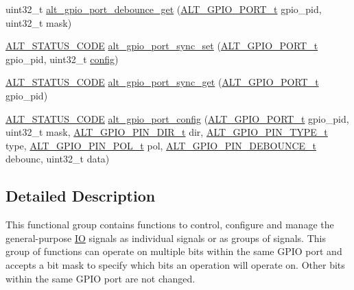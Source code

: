 \begin{DoxyCompactItemize}
\item 
uint32\+\_\+t \mbox{\hyperlink{group__ALT__GPIO__API__CONFIG_ga371b473428c4fe83d72d71d3fac76d6a}{alt\+\_\+gpio\+\_\+port\+\_\+debounce\+\_\+get}} (\mbox{\hyperlink{group__ALT__GPIO__API__CONFIG_gaaf1cf0e2a720d20cd883810f2b59097e}{A\+L\+T\+\_\+\+G\+P\+I\+O\+\_\+\+P\+O\+R\+T\+\_\+t}} gpio\+\_\+pid, uint32\+\_\+t mask)
\item 
\mbox{\hyperlink{hwlib_8h_abdb0d369f069723ca55d6c94bcaaaa12}{A\+L\+T\+\_\+\+S\+T\+A\+T\+U\+S\+\_\+\+C\+O\+DE}} \mbox{\hyperlink{group__ALT__GPIO__API__CONFIG_ga65d15bcd67c5c4388fbeff6e015a5296}{alt\+\_\+gpio\+\_\+port\+\_\+sync\+\_\+set}} (\mbox{\hyperlink{group__ALT__GPIO__API__CONFIG_gaaf1cf0e2a720d20cd883810f2b59097e}{A\+L\+T\+\_\+\+G\+P\+I\+O\+\_\+\+P\+O\+R\+T\+\_\+t}} gpio\+\_\+pid, uint32\+\_\+t \mbox{\hyperlink{structconfig__s}{config}})
\item 
\mbox{\hyperlink{hwlib_8h_abdb0d369f069723ca55d6c94bcaaaa12}{A\+L\+T\+\_\+\+S\+T\+A\+T\+U\+S\+\_\+\+C\+O\+DE}} \mbox{\hyperlink{group__ALT__GPIO__API__CONFIG_gaa829b835ee178d689b7259483947f979}{alt\+\_\+gpio\+\_\+port\+\_\+sync\+\_\+get}} (\mbox{\hyperlink{group__ALT__GPIO__API__CONFIG_gaaf1cf0e2a720d20cd883810f2b59097e}{A\+L\+T\+\_\+\+G\+P\+I\+O\+\_\+\+P\+O\+R\+T\+\_\+t}} gpio\+\_\+pid)
\item 
\mbox{\hyperlink{hwlib_8h_abdb0d369f069723ca55d6c94bcaaaa12}{A\+L\+T\+\_\+\+S\+T\+A\+T\+U\+S\+\_\+\+C\+O\+DE}} \mbox{\hyperlink{group__ALT__GPIO__API__CONFIG_gaad9e73235f34f2e08f07f8cca9d10afb}{alt\+\_\+gpio\+\_\+port\+\_\+config}} (\mbox{\hyperlink{group__ALT__GPIO__API__CONFIG_gaaf1cf0e2a720d20cd883810f2b59097e}{A\+L\+T\+\_\+\+G\+P\+I\+O\+\_\+\+P\+O\+R\+T\+\_\+t}} gpio\+\_\+pid, uint32\+\_\+t mask, \mbox{\hyperlink{group__ALT__GPIO__API__CONFIG_ga96132f0cfe4bb0ffc0f9ec8a392a45f3}{A\+L\+T\+\_\+\+G\+P\+I\+O\+\_\+\+P\+I\+N\+\_\+\+D\+I\+R\+\_\+t}} dir, \mbox{\hyperlink{group__ALT__GPIO__API__CONFIG_gafa3659cf3d59e915a16c591a73258eef}{A\+L\+T\+\_\+\+G\+P\+I\+O\+\_\+\+P\+I\+N\+\_\+\+T\+Y\+P\+E\+\_\+t}} type, \mbox{\hyperlink{group__ALT__GPIO__API__CONFIG_gac97da06ff658611bcd2b12753dfc4a10}{A\+L\+T\+\_\+\+G\+P\+I\+O\+\_\+\+P\+I\+N\+\_\+\+P\+O\+L\+\_\+t}} pol, \mbox{\hyperlink{group__ALT__GPIO__API__CONFIG_gac48653c26697d3fd17d9029252655ac2}{A\+L\+T\+\_\+\+G\+P\+I\+O\+\_\+\+P\+I\+N\+\_\+\+D\+E\+B\+O\+U\+N\+C\+E\+\_\+t}} debounc, uint32\+\_\+t data)
\end{DoxyCompactItemize}


\subsection{Detailed Description}
This functional group contains functions to control, configure and manage the general-\/purpose \mbox{\hyperlink{structIO}{IO}} signals as individual signals or as groups of signals. This group of functions can operate on multiple bits within the same G\+P\+IO port and accepts a bit mask to specify which bits an operation will operate on. Other bits within the same G\+P\+IO port are not changed.

